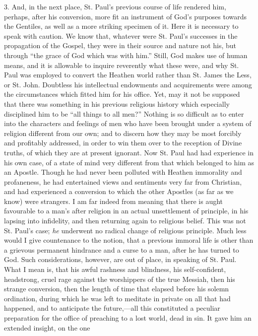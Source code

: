 3. And, in the next place, St. Paul's previous course of life
rendered him, perhaps, after his conversion, more fit an instrument of
God's purposes towards the Gentiles, as well as a more striking
specimen of it. Here it is necessary to speak with caution. We know
that, whatever were St. Paul's successes in the propagation of the
Gospel, they were in their source and nature not his, but through
``the grace of God which was with him.'' Still, God makes use
of human means, and it is allowable to inquire reverently what these
were, and why St. Paul was employed to convert the Heathen world
rather than St. James the Less, or St. John. Doubtless his
intellectual endowments and acquirements were among the circumstances
which fitted him for his office. Yet, may it not be supposed that
there was something in his previous religious history which especially
disciplined him to be ``all things to all men?'' Nothing is so
difficult as to enter into the characters and feelings of men who have
been brought under a system of religion different from our own; and to
discern how they may be most forcibly and profitably addressed, in
order to win them over to the reception of Divine truths, of which
they are at present ignorant. Now St. Paul had had experience in his
own case, of a state of mind very different from that which belonged
to him as an Apostle. Though he had never been polluted with Heathen
immorality and profaneness, he had entertained views and sentiments
very far from Christian, and had experienced a conversion to which the
other Apostles (as far as we know) were strangers. I am far indeed
from meaning that there is aught favourable to a man's after religion
in an actual unsettlement of principle, in his lapsing into
infidelity, and then returning again to religious belief. This was not
St. Paul's case; \emph{he} underwent no radical change of religious
principle. Much less would I give countenance to the notion, that a
previous immoral life is other than a grievous permanent hindrance and
a curse to a man, after he has turned to God. Such considerations,
however, are out of place, in speaking of St. Paul. What I mean is,
that his awful rashness and blindness, his self-confident, headstrong,
cruel rage against the worshippers of the true Messiah, then his
strange conversion, then the length of time that elapsed before his
solemn ordination, during which he was left to meditate in private on
all that had happened, and to anticipate the future,—all this
constituted a peculiar preparation for the office of preaching to a
lost world, dead in sin. It gave him an extended insight, on the one
